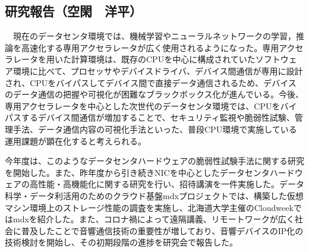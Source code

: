 \subsection{研究報告（空閑　洋平）}
　現在のデータセンタ環境では、機械学習やニューラルネットワークの学習，推論を高速化する専用アクセラレータが広く使用されるようになった。専用アクセラレータを用いた計算環境は、既存のCPUを中心に構成されていたソフトウェア環境に比べて、プロセッサやデバイスドライバ、デバイス間通信が専用に設計され、CPUをバイパスしてデバイス間で直接データ通信されるため、デバイスのデータ通信の把握や可視化が困難なブラックボックス化が進んでいる。今後、専用アクセラレータを中心とした次世代のデータセンタ環境では、CPUをバイパスするデバイス間通信が増加することで、セキュリティ監視や脆弱性試験、管理手法、データ通信内容の可視化手法といった、普段CPU環境で実施している運用課題が顕在化すると考えられる。

今年度は、このようなデータセンタハードウェアの脆弱性試験手法に関する研究を開始した。また、昨年度から引き続きNICを中心としたデータセンタハードウェアの高性能・高機能化に関する研究を行い\cite{ykuga33191433, ykuga32183289, ykuga36595746}、招待講演を一件実施した\cite{ykuga36619729}。データ科学・データ利活用のためのクラウド基盤mdxプロジェクトでは、構築した仮想マシン環境上のストレージ性能の調査を実施\cite{ykuga36616798}し、北海道大学主催のCloudweekではmdxを紹介した\cite{ykuga36619767}。また、コロナ禍によって遠隔講義、リモートワークが広く社会に普及したことで音響通信技術の重要性が増しており、音響デバイスのIP化の技術検討を開始し、その初期段階の進捗を研究会で報告した\cite{ykuga36616852}。